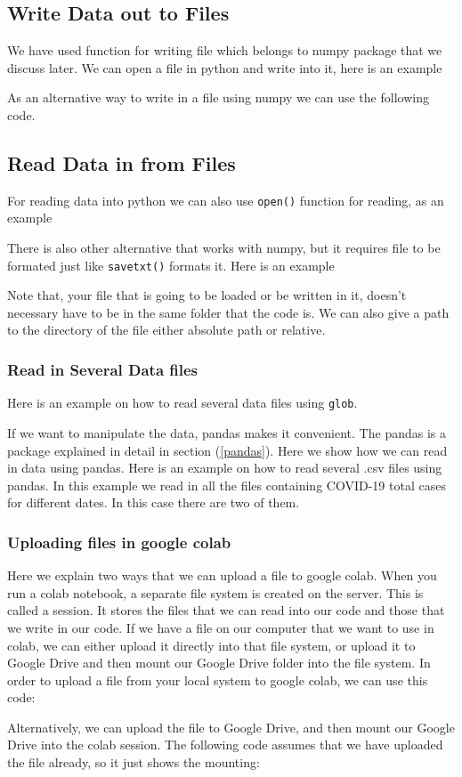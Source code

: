 \documentclass[10pt,a4paper]{article}
\newcommand{\te}{\texttt}
\begin{document}
\subsection{Write Data out to Files}

We have used function for writing file which belongs to numpy package that we discuss later. 
We can open a file in python and write into it, here is an example

As an alternative way to write in a file using numpy we can use the following code.



\subsection{Read Data in from Files} 
For reading data into python we can also use \texttt{open()} function for reading, as an example 

There is also other alternative that works with numpy, but it requires file to be formated just like \te{savetxt()} formats it.  Here is an example

Note that, your file that is going to be loaded or be written in it, doesn't necessary have to be in the same folder that the code is. We can also give a path to the directory of the file either absolute path or relative.
\subsubsection{Read in Several Data files}
Here is an example on how to read several data files using \te{glob}.

If we want to manipulate the data, pandas makes it convenient.
The pandas is a package explained in detail in section (\ref{pandas}). Here we show how we can read in data using pandas. Here is an example on how to read several .csv files using pandas. In this example we read in all the files containing COVID-19 total cases for different dates. In this case there are two of them.


\subsubsection{Uploading files in google colab}
Here we explain two ways that we can upload a file to google colab. When you run a colab notebook, a separate file system is created on the server. This is called a session. It stores the files that we can read into our code and those that we write in our code. If we have a file on our computer that we want to use in colab, we can either upload it directly into that file system, or upload it to Google Drive and then mount our Google Drive folder into the file system.
In order to upload a file from your local system to google colab, we can use this code:

Alternatively, we can upload the file to Google Drive, and then mount our Google Drive into the colab session. The following code assumes that we have uploaded the file already, so it just shows the mounting:

\end{document}
